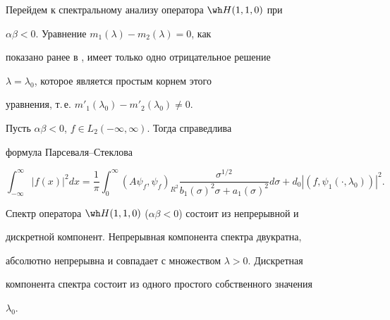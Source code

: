 \addtocounter{cor}{-2} 


 


Перейдем к спектральному анализу оператора $\wh H(1,1,0)$ при 


$\alpha\beta<0$. Уравнение $m_1(\lambda)-m_2(\lambda)=0$, как 


показано ранее в \cite{2}, имеет только одно отрицательное решение 


$\lambda=\lambda_0$, которое является простым корнем этого 


уравнения, т.\,е. $m'_1(\lambda_0)-m'_2(\lambda_0)\ne0$. 


 


\begin{thm} 


Пусть $\alpha\beta<0$, $f\in L_2(-\infty,\infty)$. Тогда справедлива 


формула Парсеваля--Стеклова 


$$ 


\int^\infty_{-\infty}|f(x)|^2dx=\frac{1}{\pi}\int^\infty_0 


(A\psi_f,\psi_f)_{R^2} 


\frac{\sigma^{1/2}}{b_1(\sigma)^2\sigma+a_1(\sigma)^2}d\sigma 


+d_0|(f,\psi_1(\cdot,\lambda_0))|^2. 


$$ 


\end{thm} 


 


\begin{cor} 


Спектр оператора $\wh H(1,1,0)$ ($\alpha\beta<0$) состоит из непрерывной и 


дискретной компонент. Непрерывная компонента спектра двукратна, 


абсолютно непрерывна и совпадает с множеством $\lambda>0$. Дискретная 


компонента спектра состоит из одного простого собственного значения 


$\lambda_0$. 


\end{cor} 


 


